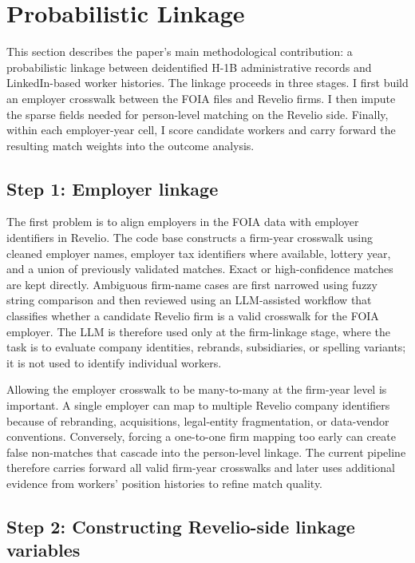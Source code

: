 \section{Probabilistic Linkage}
\label{sec:linkage}

This section describes the paper's main methodological contribution: a probabilistic linkage between deidentified H-1B administrative records and LinkedIn-based worker histories. The linkage proceeds in three stages. I first build an employer crosswalk between the FOIA files and Revelio firms. I then impute the sparse fields needed for person-level matching on the Revelio side. Finally, within each employer-year cell, I score candidate workers and carry forward the resulting match weights into the outcome analysis.

\subsection{Step 1: Employer linkage}

The first problem is to align employers in the FOIA data with employer identifiers in Revelio. The code base constructs a firm-year crosswalk using cleaned employer names, employer tax identifiers where available, lottery year, and a union of previously validated matches. Exact or high-confidence matches are kept directly. Ambiguous firm-name cases are first narrowed using fuzzy string comparison and then reviewed using an LLM-assisted workflow that classifies whether a candidate Revelio firm is a valid crosswalk for the FOIA employer. The LLM is therefore used only at the firm-linkage stage, where the task is to evaluate company identities, rebrands, subsidiaries, or spelling variants; it is not used to identify individual workers.

Allowing the employer crosswalk to be many-to-many at the firm-year level is important. A single employer can map to multiple Revelio company identifiers because of rebranding, acquisitions, legal-entity fragmentation, or data-vendor conventions. Conversely, forcing a one-to-one firm mapping too early can create false non-matches that cascade into the person-level linkage. The current pipeline therefore carries forward all valid firm-year crosswalks and later uses additional evidence from workers' position histories to refine match quality.

\subsection{Step 2: Constructing Revelio-side linkage variables}

